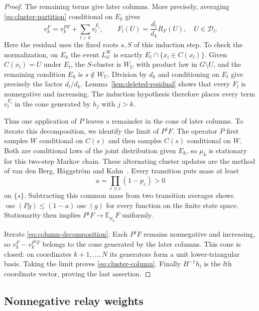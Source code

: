 \begin{proof}
The remaining terms give later columns. More precisely, averaging
\eqref{eq:cluster-partition} conditional on $E_k$ gives
\begin{equation}
\label{eq:column-decomposition}
 v_k^F=v_k^{PF}+\sum_{l>k}v_l^{F_l},\qquad
 F_l(U)=\frac{d_l}{d_k}R_F(U),\quad U\in\mathcal D_l.
\end{equation}
Here the residual uses the fixed roots $s,S$ of this induction step.
To check the normalization, on $E_k$ the event $L_{il}^W$ is exactly
$E_l\cap\{x_i\in C(x_l)\}$.  Given $C(x_l)=U$ under $E_l$, the
$S$-cluster is $W_U$ with product law in $G\setminus U$, and the remaining
condition $E_k$ is $s\notin W_U$.  Division by $d_k$ and conditioning
on $E_l$ give precisely the factor $d_l/d_k$.
Lemma~\ref{lem:deleted-residual} shows that every $F_l$ is nonnegative
and increasing.  The induction hypothesis therefore places every term
$v_l^{F_l}$ in the cone generated by $h_j$ with $j>k$.

Thus one application of $P$ leaves a remainder in the cone of later
columns. To iterate this decomposition, we identify the limit of $P^jF$.
The operator $P$ first samples $W$ conditional on $C(s)$ and then samples
$C(s)$ conditional on $W$. Both are conditional laws of the joint
distribution given $E_k$, so $\mu_k$ is stationary for this two-step
Markov chain. These alternating cluster updates are the method of
van den Berg, H\"aggstr\"om and
Kahn~\cite[Section~2.1]{VanDenBergHaggstromKahn2006}.
Every transition puts mass at least
\[
 a=\prod_{e\ni s}(1-p_e)>0
\]
on $\{s\}$.  Subtracting this common mass from two transition averages
shows $\operatorname{osc}(Pg)\le(1-a)\operatorname{osc}(g)$ for every
function on the finite state space.  Stationarity then implies
$P^jF\to\mathbb E_{\mu_k}F$ uniformly.

Iterate \eqref{eq:column-decomposition}.  Each $P^jF$ remains
nonnegative and increasing, so $v_k^F-v_k^{P^jF}$ belongs to the cone
generated by the later columns.  This cone is closed: on coordinates
$k+1,\ldots,N$ its generators form a unit lower-triangular basis.
Taking the limit proves \eqref{eq:cluster-column}.  Finally
$H^{-1}h_l$ is the $l$th coordinate vector, proving the last assertion.
\end{proof}

\subsection{Nonnegative relay weights}

